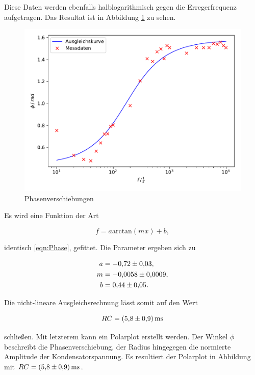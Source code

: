 Diese Daten werden ebenfalls halblogarithmisch gegen die Erregerfrequenz 
aufgetragen. Das Resultat ist in Abbildung \ref{fig:plot3} zu sehen. 

\begin{figure}
  \centering
  \includegraphics[scale=0.8]{content/plot3.pdf}
  \caption{Phasenverschiebungen}
  \label{fig:plot3}
\end{figure}

Es wird eine Funktion der Art 

\begin{equation*}
f = a\text{arctan}(mx)+b,
\end{equation*}

identisch \eqref{eqn:Phase}, gefittet. Die Parameter ergeben sich zu 

\begin{align*}
a &= \num{-0.72+-0.03},\\
m &= \num{-0.0058+-0.0009},\\
b &= \num{0.44+-0.05}.
\end{align*}

Die nicht-lineare Ausgleichsrechnung lässt somit auf den Wert

\begin{equation*}
RC = \SI{5.8+-0.9}{\milli\second}
\end{equation*}

schließen.
Mit letzterem kann ein Polarplot erstellt werden. Der Winkel $\phi$ beschreibt 
die Phasenverschiebung, der Radius hingegegen die normierte Amplitude der
Kondensatorspannung. Es resultiert der Polarplot in Abbildung mit 
$RC = \SI{5.8+-0.9}{\milli\second}$.

